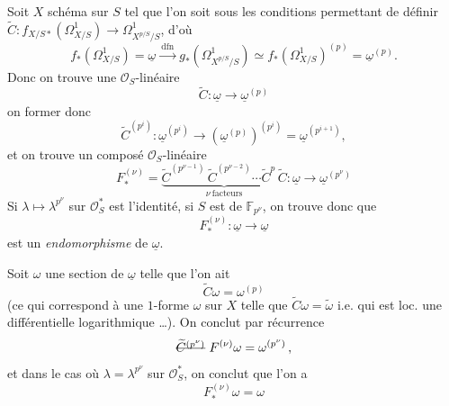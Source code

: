 \documentclass[11pt,a4paper]{article}
\begin{document}
Soit $X$ schéma sur $S$ tel que l'on soit sous les conditions permettant de
définir $\widetilde{C} : f_{X/S*}(\Omega^1_{X/S})\to\Omega^1_{X^{p/S}/S}$,
d'où
\[
  f_*(\Omega^1_{X/S}) = \underline{\omega} \xrightarrow{\ \mathrm{dfn}\ }
  g_*(\Omega^1_{X^{p/S}/S}) \simeq f_*(\Omega^1_{X/S})^{(p)} =
  \underline{\omega}^{(p)}.
\]
Donc on trouve une  $\mathcal{O}_S$-linéaire
\[
  \widetilde{C} : \underline{\omega}\longrightarrow\underline{\omega}^{(p)}
\]
on  former donc
\[
  \widetilde{C}^{(p^i)} : \underline{\omega}^{(p^i)} \longrightarrow
  (\underline{\omega}^{(p)})^{(p^i)} = \underline{\omega}^{(p^{i+1})},
\]
et on trouve un composé $\mathcal{O}_S$-linéaire
\[
  F_*^{(\nu)} = \underbrace{\widetilde{C}^{(p^{\nu-1})}\,
  \widetilde{C}^{(p^{\nu-2})}\cdots\widetilde{C}^{p}\,\widetilde{C}}_{\nu\ \text{facteurs}}
  : \underline{\omega}\longrightarrow\underline{\omega}^{(p^\nu)}
\]
Si $\lambda\mapsto\lambda^{p^\nu}$ sur $\mathcal{O}_S^*$ est l'identité,
 si $S$ est  de $\mathbb{F}_{p^\nu}$,
on trouve donc que
\[
  F_*^{(\nu)} : \underline{\omega}\longrightarrow\underline{\omega}
\]
est un \emph{endomorphisme}  de
$\underline{\omega}$.

Soit $\omega$ une section de $\underline{\omega}$ telle que l'on ait
\[
  \widetilde{C}\omega = \omega^{(p)}
\]
(ce qui correspond à une  $1$-forme $\omega$ sur $X$ telle
que $\widetilde{C}\omega = \widetilde{\omega}$ i.e. qui est loc. une
différentielle logarithmique …). On conclut par récurrence
\[
  \text{\struck{$\widetilde{C}^{(p^\nu)}$}}\ F^{(\nu)}\omega = \omega^{(p^\nu)}\,,
\]
et dans le cas où $\lambda = \lambda^{p^\nu}$ sur $\mathcal{O}_S^*$, on conclut
que l'on a
\[
  \boxed{\ F_*^{(\nu)}\omega = \omega\ }
\]

\end{document}

